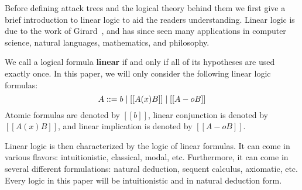 Before defining attack trees and the logical theory behind them we
first give a brief introduction to linear logic to aid the readers
understanding.  Linear logic is due to the work of
Girard~\cite{Girard:1987}, and has since seen many applications in
computer science, natural languages, mathematics, and philosophy.

We call a logical formula \textbf{linear} if and only if all of its
hypotheses are used exactly once.  In this paper, we will only
consider the following linear logic formulas:
\[
A ::= b \mid [[A (x) B]] \mid [[A -o B]]\\
\]
Atomic formulas are denoted by $[[b]]$, linear conjunction is denoted
by $[[A (x) B]]$, and linear implication is denoted by $[[A -o B]]$.


Linear logic is then characterized by the logic of linear formulas.
It can come in various flavors: intuitionistic, classical, modal, etc.
Furthermore, it can come in several different formulations: natural
deduction, sequent calculus, axiomatic, etc.  Every logic in this
paper will be intuitionistic and in natural deduction form.


